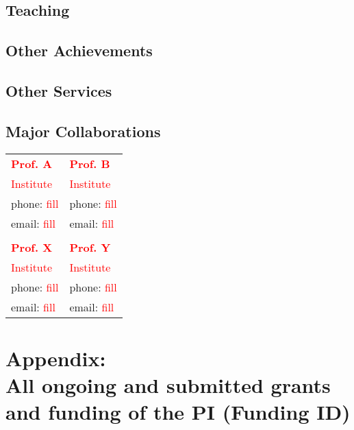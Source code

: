 \subsection*{Teaching}

\subsection*{Other Achievements}


\subsection*{Other Services}

\subsection*{Major Collaborations}
\vspace*{1em}
{\small
\begin{tabular}{p{6cm}p{7cm}}
\textbf{\textcolor{red}{Prof. A}}						& \textbf{\textcolor{red}{Prof. B}}\\
\textcolor{red}{Institute}								& \textcolor{red}{Institute}\\
phone: \textcolor{red}{fill}							& phone: \textcolor{red}{fill}\\
email: \textcolor{red}{fill}							& email: \textcolor{red}{fill}\\
\\[-0.1cm]
\textbf{\textcolor{red}{Prof. X}}						& \textbf{\textcolor{red}{Prof. Y}}\\
\textcolor{red}{Institute}								& \textcolor{red}{Institute}\\
phone: \textcolor{red}{fill}							& phone: \textcolor{red}{fill}\\
email: \textcolor{red}{fill}							& email: \textcolor{red}{fill}\\
\end{tabular}
}

\newpage
\section*{Appendix:\\ All ongoing and submitted grants and funding of the PI (Funding ID)}
